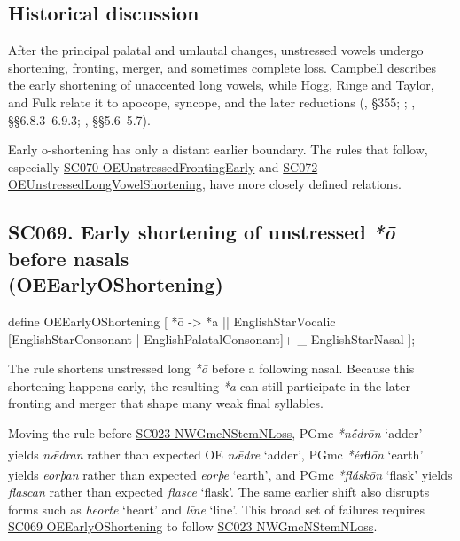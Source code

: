 \documentclass[
  british,
  a4paper,
  openany]{book}
\providecommand{\Pred}[1]{\textsuperscript{\dag}\emph{#1}}
\providecommand{\Recon}[1]{\emph{*#1}}
{\catcode`→=\active \global\def→{\ensuremath{\rightarrow}}}
\providecommand{\texorpdfstring}[2]{#1}
\DeclareRobustCommand{\CAPRRuleHeading}[2]{%
  #1\texorpdfstring{\\(#2)}{ (#2)}%
}
\providecommand{\Pred}[1]{\textsuperscript{\dag}\emph{#1}}
\providecommand{\Recon}[1]{\emph{*#1}}
{\catcode`→=\active \global\def→{\ensuremath{\rightarrow}}}
\begin{document}
\subsection{Historical discussion}\label{historical-discussion-35}

After the principal palatal and umlautal changes, unstressed vowels
undergo shortening, fronting, merger, and sometimes complete loss.
Campbell describes the early shortening of unaccented long vowels, while
Hogg, Ringe and Taylor, and Fulk relate it to apocope, syncope, and the
later reductions (, §355;
;
,
§§6.8.3--6.9.3; , §§5.6--5.7).

Early o-shortening has only a distant earlier boundary. The rules that
follow, especially \hyperref[rule-OEUnstressedFrontingEarly]{SC070
OEUnstressedFrontingEarly} and
\hyperref[rule-OEUnstressedLongVowelShortening]{SC072
OEUnstressedLongVowelShortening}, have more closely defined relations.

\subsection{\texorpdfstring{\CAPRRuleHeading{SC069. Early shortening of unstressed \emph{*ō} before nasals}{OEEarlyOShortening}}{}}\label{rule-OEEarlyOShortening}

\begin{ReaderFacingFoma}
define OEEarlyOShortening [
    {*ō} -> {*a} || EnglishStarVocalic [EnglishStarConsonant | EnglishPalatalConsonant]+ _ EnglishStarNasal
];
\end{ReaderFacingFoma}

The rule shortens unstressed long \emph{*ō} before a following nasal.
Because this shortening happens early, the resulting \emph{*a} can still
participate in the later fronting and merger that shape many weak final
syllables.

Moving the rule before \hyperref[rule-NWGmcNStemNLoss]{SC023
NWGmcNStemNLoss}, PGmc \Recon{nḗdrōn} `adder' yields \Pred{nǣdran}
rather than expected OE \emph{nǣdre} `adder', PGmc \Recon{érθōn} `earth'
yields \Pred{eorþan} rather than expected \emph{eorþe} `earth', and PGmc
\Recon{fláskōn} `flask' yields \Pred{flascan} rather than expected
\emph{flasce} `flask'. The same earlier shift also disrupts forms such
as \emph{heorte} `heart' and \emph{līne} `line'. This broad set of
failures requires \hyperref[rule-OEEarlyOShortening]{SC069
OEEarlyOShortening} to follow \hyperref[rule-NWGmcNStemNLoss]{SC023
NWGmcNStemNLoss}.
\end{document}
